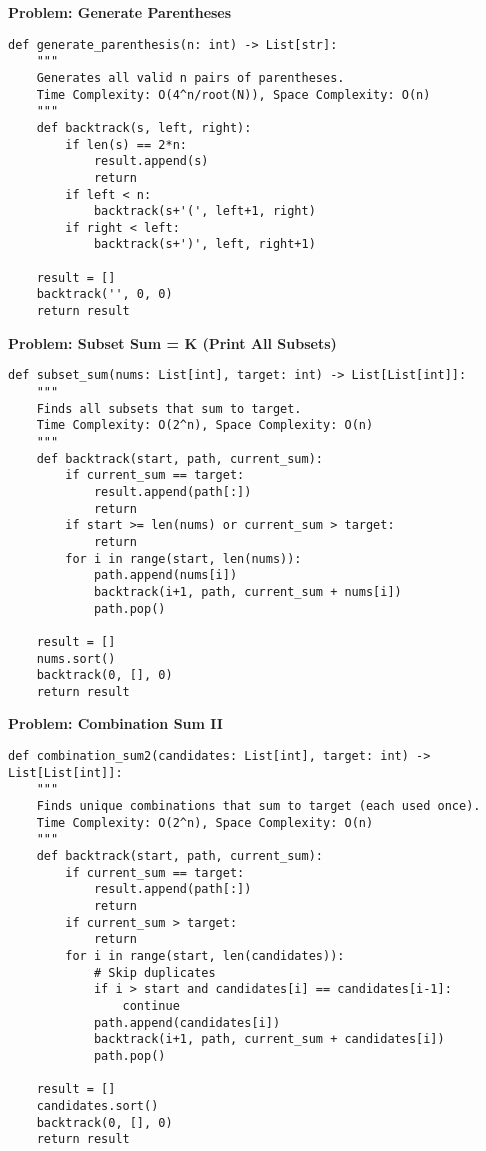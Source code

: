 \noindent\textbf{Problem: Generate Parentheses}
\begin{verbatim}
def generate_parenthesis(n: int) -> List[str]:
    """
    Generates all valid n pairs of parentheses.
    Time Complexity: O(4^n/root(N)), Space Complexity: O(n)
    """
    def backtrack(s, left, right):
        if len(s) == 2*n:
            result.append(s)
            return
        if left < n:
            backtrack(s+'(', left+1, right)
        if right < left:
            backtrack(s+')', left, right+1)
            
    result = []
    backtrack('', 0, 0)
    return result
\end{verbatim}

\noindent\textbf{Problem: Subset Sum = K (Print All Subsets)}
\begin{verbatim}
def subset_sum(nums: List[int], target: int) -> List[List[int]]:
    """
    Finds all subsets that sum to target.
    Time Complexity: O(2^n), Space Complexity: O(n)
    """
    def backtrack(start, path, current_sum):
        if current_sum == target:
            result.append(path[:])
            return
        if start >= len(nums) or current_sum > target:
            return
        for i in range(start, len(nums)):
            path.append(nums[i])
            backtrack(i+1, path, current_sum + nums[i])
            path.pop()
            
    result = []
    nums.sort()
    backtrack(0, [], 0)
    return result
\end{verbatim}

\noindent\textbf{Problem: Combination Sum II}
\begin{verbatim}
def combination_sum2(candidates: List[int], target: int) -> List[List[int]]:
    """
    Finds unique combinations that sum to target (each used once).
    Time Complexity: O(2^n), Space Complexity: O(n)
    """
    def backtrack(start, path, current_sum):
        if current_sum == target:
            result.append(path[:])
            return
        if current_sum > target:
            return
        for i in range(start, len(candidates)):
            # Skip duplicates
            if i > start and candidates[i] == candidates[i-1]:
                continue
            path.append(candidates[i])
            backtrack(i+1, path, current_sum + candidates[i])
            path.pop()
            
    result = []
    candidates.sort()
    backtrack(0, [], 0)
    return result
\end{verbatim}

